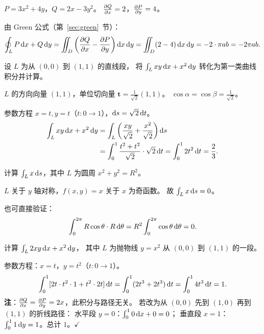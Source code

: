 \documentclass{article}
\begin{document}
\begin{solution}
  $P = 3x^2+4y$，$Q = 2x-3y^2$。
  $\frac{\partial Q}{\partial x} = 2$，$\frac{\partial P}{\partial y} = 4$。

  由 Green 公式（第~\ref{sec:green}~节）：
  \[
    \oint_L P\,\mathrm{d} x + Q\,\mathrm{d} y
    = \iint_D \left(\frac{\partial Q}{\partial x} - \frac{\partial P}{\partial y}\right) \mathrm{d} x\,\mathrm{d} y
    = \iint_D (2-4) \,\mathrm{d} x\,\mathrm{d} y
    = -2 \cdot \pi ab
    = -2\pi ab.
  \]
\end{solution}

\begin{exercise}[两类曲线积分的转化]
  设 $L$ 为从 $(0,0)$ 到 $(1,1)$ 的直线段，
  将 $\int_L xy \,\mathrm{d} x + x^2 \,\mathrm{d} y$ 转化为第一类曲线积分并计算。
\end{exercise}

\begin{solution}
  $L$ 的方向向量 $(1,1)$，单位切向量 $\mathbf{t} = \frac{1}{\sqrt{2}}(1,1)$。
  $\cos\alpha = \cos\beta = \frac{1}{\sqrt{2}}$。

  参数方程 $x = t, y = t$（$t: 0 \to 1$），$\mathrm{d} s = \sqrt{2}\,\mathrm{d} t$。
  \begin{align*}
    \int_L xy\,\mathrm{d} x + x^2\,\mathrm{d} y
    &= \int_L \left(\frac{xy}{\sqrt{2}} + \frac{x^2}{\sqrt{2}}\right) \mathrm{d} s \\
    &= \int_0^1 \frac{t^2 + t^2}{\sqrt{2}} \cdot \sqrt{2} \,\mathrm{d} t
    = \int_0^1 2t^2 \,\mathrm{d} t
    = \frac{2}{3}.
  \end{align*}
\end{solution}

\begin{exercise}
  计算 $\int_L x \,\mathrm{d} s$，其中 $L$ 为圆周 $x^2+y^2 = R^2$。
\end{exercise}

\begin{solution}
  $L$ 关于 $y$ 轴对称，$f(x,y)=x$ 关于 $x$ 为奇函数。
  故 $\int_L x \,\mathrm{d} s = 0$。

  也可直接验证：
  \[
    \int_0^{2\pi} R\cos\theta \cdot R \,\mathrm{d}\theta
    = R^2 \int_0^{2\pi} \cos\theta \,\mathrm{d}\theta = 0.
  \]
\end{solution}

\begin{exercise}
  计算 $\int_L 2xy \,\mathrm{d} x + x^2 \,\mathrm{d} y$，
  其中 $L$ 为抛物线 $y = x^2$ 从 $(0,0)$ 到 $(1,1)$ 的一段。
\end{exercise}

\begin{solution}
  参数方程：$x = t$，$y = t^2$（$t: 0 \to 1$）。
  \[
    \int_0^1 [2t \cdot t^2 \cdot 1 + t^2 \cdot 2t] \,\mathrm{d} t
    = \int_0^1 (2t^3 + 2t^3) \,\mathrm{d} t
    = \int_0^1 4t^3 \,\mathrm{d} t
    = 1.
  \]
  \textbf{注}：$\frac{\partial Q}{\partial x} = \frac{\partial P}{\partial y} = 2x$，此积分与路径无关。
  若改为从 $(0,0)$ 先到 $(1,0)$ 再到 $(1,1)$ 的折线路径：
  水平段 $y=0$：$\int_0^1 0 \,\mathrm{d} x + 0 = 0$；
  垂直段 $x=1$：$\int_0^1 1 \,\mathrm{d} y = 1$。总计 $1$。$\checkmark$
\end{solution}
\end{document}
